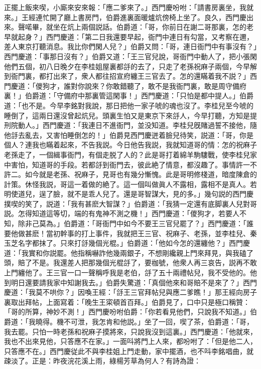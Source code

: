 正擺上飯來喫，小廝來安來報：「應二爹來了。」西門慶吩咐：「請書房裏坐，我就來。」王經連忙開了廳上書房門，伯爵進裏面暖爐炕傍椅上坐了。良久，西門慶出來。聲喏畢，就坐在炕上兩個説話。伯爵道：「哥，你前日在謝二哥那裏，怎的老早就起身？」西門慶道：「第二日我還要早起，衙門中連日有勾當，又考察在邇，差人東京打聽消息。我比你們閑人兒？」伯爵又問：「哥，連日衙門中有事沒有？」西門慶道：「事那日沒有？」伯爵又道：「王三官兒說，哥衙門中動人了，把小張閑他們五個，初八日晚夕在李桂姐屋裏都㧱的去了，只走了老孫祝麻子兩個，今早解到衙門裏，都打出來了，衆人都往招宣府纏王三官去了。怎的還瞞着我不説？」西門慶道：「儍狗才，誰對你說來？你敢錯聽了，敢不是我衙門裏，敢是周守備府裏！」伯爵道：「守備府中那裏管這閑事！」西門慶道：「只怕是都中提人。」伯爵道：「也不是。今早李銘對我說，那日把他一家子唬的魂也沒了。李桂兒至今唬的睡倒了，這兩日還沒曾起炕兒。頭裏生怕又是東京下來㧱人，今早打聽，方知是提刑院動人。」西門慶道：「我連日不進衙門，並没知道。李桂兒旣賭過誓不接他，隨他㧱去亂去，又害怕睡倒怎的！」伯爵見西門慶迸着臉兒待笑，説道：「哥，你是個人？連我也瞞着起來，不告我説。今日他告我説，我就知道哥的情：怎的祝麻子老孫走了，一個緝事衙門，有個走脱了人的？此是哥打着綿羊駒䮫戰，使李桂兒家中害怕，知道哥的手段。若都㧱到衙門去，彼此絶了情意，都沒趣了。事情許一不許二。如今就是老孫、祝麻子，見哥也有幾分慚愧。此是哥明修棧道，暗度陳倉的計策。休怪我説，哥這一着做的絶了。這一個叫做眞人不露相，露相不是真人。若明使道兒，逞了臉，就不是乖人兒了。還是哥智謀大，見的多。」幾句説的西門慶撲喫的笑了，説道：「我有甚麽大智謀？」伯爵道：「我猜一定還有底脚裏人兒對哥説。怎得知道這等切，端的有鬼神不測之機！」西門慶道：「儍狗才，若要人不知，除非己莫為。」伯爵道：「哥衙門中如今不要王三官兒罷了？」西門慶道：「誰要他做甚麽！當初幹事的打上事件，我就把王三官、祝麻子、老孫，並李桂兒、秦玉芝名字都抹了。只來打㧱幾個光棍。」伯爵道：「他如今怎的還纏他？」西門慶道：「我實和你説罷。他指稱嚇詐他幾兩銀子，不想剛纔親上門來拜見，與我磕了頭，賠了不是。我還差人把那幾個光棍㧱了，要枷號，他衆人再三哀告，説再不敢上門纏他了。王三官一口一聲稱呼我是老伯，㧱了五十兩禮帖兒，我不受他的。他到明日還要請我家中知謝我去。」伯爵失驚道：「真個他來和哥賠不是來了？」西門慶道：「我莫不哄你？」因喚王經：「㧱王三官拜帖兒與應二爹瞧！」那王經向房子裏取出拜帖，上面寫着：「晚生王寀頓首百拜。」伯爵見了，口中只是極口稱贊：「哥的所算，神妙不測！」西門慶吩咐伯爵：「你若看見他們，只說我不知道。」伯爵道：「我曉得。機不可泄，我怎肯和他説。」坐了一回，喫了茶，伯爵道：「哥，我去罷。只怕一時老孫和祝麻子摸將來，只說我沒到這裏。」西門慶道：「他就來，我也不出來見他，只答應不在家。」一面呌將門上人來，都吩咐了：「但是他二人，只答應不在。」西門慶従此不與李桂姐上門走動，家中擺酒，也不呌李銘唱曲，就疎淡了。正是：昨夜浣花溪上雨，綠楊芳草為何人？有詩為證：

